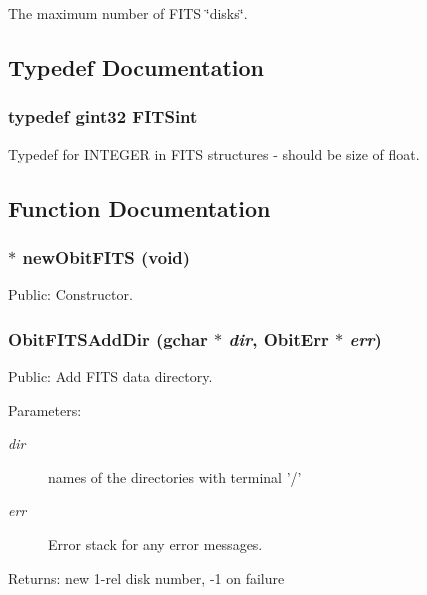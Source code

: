 The maximum number of FITS \char`\"{}disks\char`\"{}. 



\subsection{Typedef Documentation}
\subsubsection{\setlength{\rightskip}{0pt plus 5cm}typedef gint32 {\bf FITSint}}\label{ObitFITS_8h_a1}


Typedef for INTEGER in FITS structures - should be size of float. 



\subsection{Function Documentation}
\subsubsection{$\ast$ new\-Obit\-FITS (void)}\label{ObitFITS_8h_a3}


Public: Constructor. 

\subsubsection{ Obit\-FITSAdd\-Dir (gchar $\ast$ {\em dir}, {\bf Obit\-Err} $\ast$ {\em err})}\label{ObitFITS_8h_a5}


Public: Add FITS data directory. 

\begin{Desc}
\item[Parameters:]
\begin{description}
\item[{\em dir}]names of the directories with terminal '/' \item[{\em err}]Error stack for any error messages. \end{description}
\end{Desc}
\begin{Desc}
\item[Returns:]new 1-rel disk number, -1 on failure \end{Desc}
